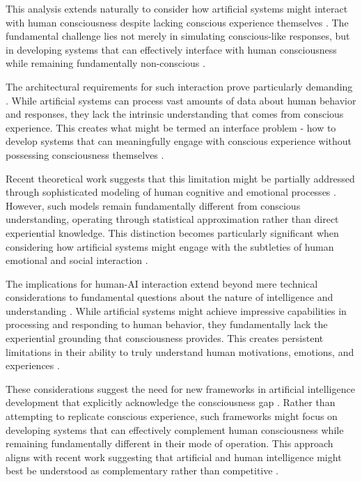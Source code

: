 This analysis extends naturally to consider how artificial systems might interact with human consciousness despite lacking conscious experience themselves \cite{Brooks1999}. The fundamental challenge lies not merely in simulating conscious-like responses, but in developing systems that can effectively interface with human consciousness while remaining fundamentally non-conscious \cite{Sloman2019}.

The architectural requirements for such interaction prove particularly demanding \cite{Hawkins2021}. While artificial systems can process vast amounts of data about human behavior and responses, they lack the intrinsic understanding that comes from conscious experience. This creates what might be termed an interface problem - how to develop systems that can meaningfully engage with conscious experience without possessing consciousness themselves \cite{Braitenberg1986}.

Recent theoretical work suggests that this limitation might be partially addressed through sophisticated modeling of human cognitive and emotional processes \cite{Lake2017}. However, such models remain fundamentally different from conscious understanding, operating through statistical approximation rather than direct experiential knowledge. This distinction becomes particularly significant when considering how artificial systems might engage with the subtleties of human emotional and social interaction \cite{Marcus2019}.

The implications for human-AI interaction extend beyond mere technical considerations to fundamental questions about the nature of intelligence and understanding \cite{Mitchell2019}. While artificial systems might achieve impressive capabilities in processing and responding to human behavior, they fundamentally lack the experiential grounding that consciousness provides. This creates persistent limitations in their ability to truly understand human motivations, emotions, and experiences \cite{ORegan2011}.

These considerations suggest the need for new frameworks in artificial intelligence development that explicitly acknowledge the consciousness gap \cite{Dennett2017}. Rather than attempting to replicate conscious experience, such frameworks might focus on developing systems that can effectively complement human consciousness while remaining fundamentally different in their mode of operation. This approach aligns with recent work suggesting that artificial and human intelligence might best be understood as complementary rather than competitive \cite{Pearl2018}.

